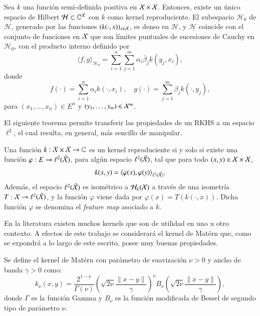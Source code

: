 \begin{teo}
Sea \( k \) una función semi-definida positiva en \( \mathcal{X} \times \mathcal{X} \). Entonces, existe un único espacio de Hilbert \( \mathcal{H} \subset \mathbb{C}^{\mathcal{X}} \) con \( k \) como kernel reproduciente. El subespacio \( \mathcal{H}_0 \) de \( \mathcal{H} \), generado por las funciones \( (k(\cdot, x))_{x \in \mathcal{X}} \), es denso en \( \mathcal{H} \), y \( \mathcal{H} \) coincide con el conjunto de funciones en \( \mathcal{X} \) que son límites puntuales de sucesiones de Cauchy en \( \mathcal{H}_0 \), con el producto interno definido por
\[
\langle f, g \rangle_{\mathcal{H}_0} = \sum_{i=1}^n \sum_{j=1}^m \alpha_i \bar{\beta}_j k(y_j, x_i),
\]
donde
\[
f(\cdot) = \sum_{i=1}^n \alpha_i k(\cdot, x_i), \quad g(\cdot) = \sum_{j=1}^m \beta_j k(\cdot, y_j),
\]
para \( (x_1, \dots, x_n) \in E^n \) y \( (y_1, \dots, y_m) \in \mathcal{X}^m \).
\end{teo}

\noindent El siguiente teorema permite transferir las propiedades de un RKHS a un espacio \( \ell^2 \), el cual resulta, en general, más sencillo de manipular.

\begin{teo}
Una función \( k: \mathcal{X} \times \mathcal{X} \to \mathbb{C} \) es un kernel reproduciente si y solo si existe una función \( \varphi: E \to \ell^2 (\Tilde{\mathcal{X}}) \), para algún espacio \( \ell^2(\Tilde{\mathcal{X}}) \), tal que para todo \( (x, y) \in \mathcal{X} \times \mathcal{X} \),
\[
k(x, y)= \langle \varphi(x), \varphi(y) \rangle_{\ell^2(\Tilde{\mathcal{X}})}.
\]
Además, el espacio \( \ell^2(\Tilde{\mathcal{X}}) \) es isométrico a \( \mathcal{H}_k(\mathcal{X}) \) a través de una isometría \( T: \mathcal{X} \to \ell^2(\Tilde{\mathcal{X}}) \), y la función \( \varphi \) viene dada por \( \varphi(x) = T(k(\cdot, x)) \). Dicha función \( \varphi \) se denomina el \textit{feature map} asociado a \( k \).
\end{teo}
En la literatura existen muchos kernels que son de utilidad en uno u otro contexto. A efectos de este trabajo se considerará el kernel de Matérn que, como se expondrá a lo largo de este escrito, posee muy buenas propiedades.
\begin{defn}
Se define el kernel de Matérn con parámetro de suavización \( \nu > 0 \) y ancho de banda \( \gamma > 0 \) como:
\[
k_{\nu}(x,y) = \frac{2^{1-\nu}}{\Gamma(\nu)} \left( \sqrt{2\nu} \frac{\|x-y\|}{\gamma} \right)^\nu B_\nu \left( \sqrt{2\nu} \frac{\|x-y\|}{\gamma} \right),
\]
donde \( \Gamma \) es la función Gamma y \( B_\nu \) es la función modificada de Bessel de segundo tipo de parámetro \( \nu \).

\end{defn}

